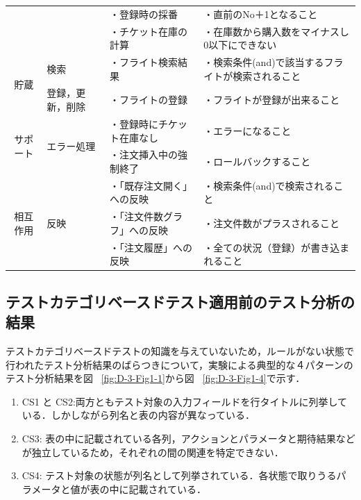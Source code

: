 \begin{table}[htbp]
\begin{tabular}{|c|l|p{10.5em}|p{13em}|}
          &       & ・登録時の採番 & ・直前のNo＋1となること \\
          &       & ・チケット在庫の計算 & ・在庫数から購入数をマイナスし0以下にできない \\
    \hline
    \multicolumn{1}{|c|}{\multirow{2}[4]{*}{貯蔵}} & \multicolumn{1}{p{7.75em}|}{検索} & ・フライト検索結果 & ・検索条件(and)で該当するフライトが検索されること \bigstrut\\
\cline{2-4}          & \multicolumn{1}{p{7.75em}|}{登録，更新，削除} & ・フライトの登録 & ・フライトが登録が出来ること \bigstrut\\
    \hline
    \multicolumn{1}{|c|}{\multirow{2}[2]{*}{サポート}} & \multicolumn{1}{l|}{\multirow{2}[2]{*}{エラー処理}} & ・登録時にチケット在庫なし & ・エラーになること\bigstrut[t]\\
          &       & ・注文挿入中の強制終了 & ・ロールバックすること \bigstrut[b]\\
    \hline
    \multicolumn{1}{|c|}{\multirow{3}[2]{*}{相互作用}} & \multicolumn{1}{l|}{\multirow{3}[2]{*}{反映}} & ・「既存注文開く」への反映 & ・検索条件(and)で検索されること \bigstrut[t]\\
          &       & ・「注文件数グラフ」への反映 & ・注文件数がプラスされること \\
          &       & ・「注文履歴」への反映 & ・全ての状況（登録）が書き込まれること \bigstrut[b]\\
    \hline
    \end{tabular}%
  \label{tab:D-3-ensyu2}%
\end{table}%

\subsection{テストカテゴリベースドテスト適用前のテスト分析の結果}

テストカテゴリベースドテストの知識を与えていないため，ルールがない状態で行われたテスト分析結果のばらつきについて，実験による典型的な４パターンのテスト分析結果を図 ~\ref{fig:D-3-Fig1-1}から図 ~\ref{fig:D-3-Fig1-4}で示す．
\begin{enumerate}
\item CS1 と CS2:両方ともテスト対象の入力フィールドを行タイトルに列挙している．しかしながら列名と表の内容が異なっている．
\item CS3: 表の中に記載されている各列，アクションとパラメータと期待結果などが独立しているため，それぞれの間の関連を特定できない．
\item CS4: テスト対象の状態が列名として列挙されている．各状態で取りうるパラメータと値が表の中に記載されている．
\end{enumerate}

